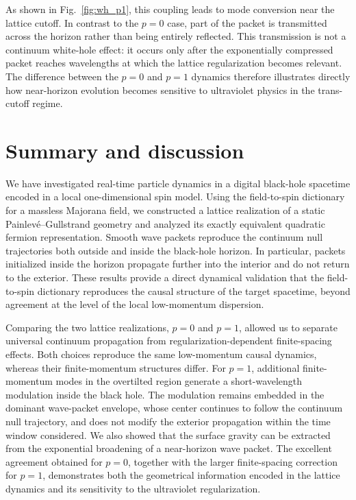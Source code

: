 \documentclass[reprint,amsmath,amssymb,aps,prb,showkeys,superscriptaddress]{revtex4-2}
\begin{document}
As shown in Fig.~\ref{fig:wh_p1}, this coupling leads to mode
conversion near the lattice cutoff. In contrast to the $p=0$ case,
part of the packet is transmitted across the horizon rather than
being entirely reflected. This transmission is not a continuum
white-hole effect: it occurs only after the exponentially compressed
packet reaches wavelengths at which the lattice regularization
becomes relevant. The difference between the $p=0$ and $p=1$
dynamics therefore illustrates directly how near-horizon evolution
becomes sensitive to ultraviolet physics in the trans-cutoff regime.

\section{Summary and discussion}
\label{sec:summary}

We have investigated real-time particle dynamics in a digital
black-hole spacetime encoded in a local one-dimensional spin model.
Using the field-to-spin dictionary for a massless Majorana field, we
constructed a lattice realization of a static
Painlev\'e--Gullstrand geometry and analyzed its exactly equivalent
quadratic fermion representation. Smooth wave packets reproduce the
continuum null trajectories both outside and inside the black-hole
horizon. In particular, packets initialized inside the horizon
propagate further into the interior and do not return to the
exterior. These results provide a direct dynamical validation that
the field-to-spin dictionary reproduces the causal structure of the
target spacetime, beyond agreement at the level of the local
low-momentum dispersion.

Comparing the two lattice realizations, $p=0$ and $p=1$, allowed us
to separate universal continuum propagation from
regularization-dependent finite-spacing effects. Both choices
reproduce the same low-momentum causal dynamics, whereas their
finite-momentum structures differ. For $p=1$, additional
finite-momentum modes in the overtilted region generate a
short-wavelength modulation inside the black hole. The modulation
remains embedded in the dominant wave-packet envelope, whose center
continues to follow the continuum null trajectory, and does not
modify the exterior propagation within the time window considered.
We also showed that the surface gravity can be extracted from the
exponential broadening of a near-horizon wave packet. The excellent
agreement obtained for $p=0$, together with the larger
finite-spacing correction for $p=1$, demonstrates both the
geometrical information encoded in the lattice dynamics and its
sensitivity to the ultraviolet regularization.
\end{document}
